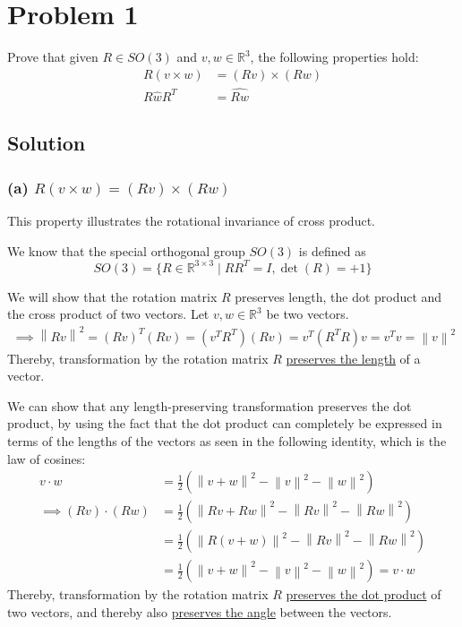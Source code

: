 \section*{Problem 1}

Prove that given \(R \in S O(3)\) and \(v, w \in \mathbb{R}^{3}\), the following properties hold:
\begin{align*}
    R(v \times w)   & =(R v) \times(R w) \\
    R \hat{w} R^{T} & =\widehat{R w}
\end{align*}

\subsection*{Solution}

\subsubsection*{(a) \( R(v \times w) =(R v) \times(R w) \)}

This property illustrates the rotational invariance of cross product.

We know that the special orthogonal group \( SO(3) \) is defined as
\[
    SO(3) = \{ R \in \mathbb{R}^{3 \times 3} \mid R R^{T} = I, \det(R) = +1 \}
\]

We will show that the rotation matrix \( R \) preserves length, the dot product and the cross product of two vectors.
Let \( v, w \in \mathbb{R}^{3} \) be two vectors.
\begin{align*}
    \implies
    \left \| R v \right \| ^{2}
        = {(R v)}^{T} (R v)
    = (v^{T} R^{T}) (R v)
    = v^{T} (R^{T} R) v
    = v^{T} v
    = \left \| v \right \| ^{2}
\end{align*}
Thereby, transformation by the rotation matrix \( R \) \underline{preserves the length} of a vector.

We can show that any length-preserving transformation preserves the dot product, by using the fact that the dot product can completely be expressed in terms of the lengths of the vectors as seen in the following identity, which is the law of cosines:
\begin{align*}
    v \cdot w
     & = \frac{1}{2} \left( \left \| v + w \right \| ^{2} - \left \| v \right \| ^{2} - \left \| w \right \| ^{2} \right)
    \\ \implies
    (R v) \cdot (R w)
     & = \frac{1}{2} \left( \left \| R v + R w \right \| ^{2} - \left \| R v \right \| ^{2} - \left \| R w \right \| ^{2} \right)
    \\ & = \frac{1}{2} \left( \left \| R (v + w) \right \| ^{2} - \left \| R v \right \| ^{2} - \left \| R w \right \| ^{2} \right)
    \\ & = \frac{1}{2} \left( \left \| v + w \right \| ^{2} - \left \| v \right \| ^{2} - \left \| w \right \| ^{2} \right)
    = v \cdot w
\end{align*}
Thereby, transformation by the rotation matrix \( R \) \underline{preserves the dot product} of two vectors, and thereby also \underline{preserves the angle} between the vectors.

